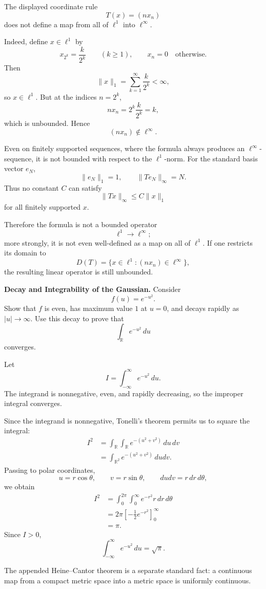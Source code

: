 \begin{solution}
The displayed coordinate rule
\[
T(x)=(n x_n)
\]
does not define a map from all of \(\ell^1\) into \(\ell^\infty\).

Indeed, define \(x\in\ell^1\) by
\[
x_{2^k}=\frac{k}{2^k}\qquad(k\ge1),
\qquad
x_n=0\quad\text{otherwise}.
\]
Then
\[
\|x\|_1
=
\sum_{k=1}^{\infty}\frac{k}{2^k}
<\infty,
\]
so \(x\in\ell^1\). But at the indices \(n=2^k\),
\[
n x_n
=
2^k\frac{k}{2^k}
=
k,
\]
which is unbounded. Hence
\[
(nx_n)\notin\ell^\infty.
\]

Even on finitely supported sequences, where the formula always produces an
\(\ell^\infty\)-sequence, it is not bounded with respect to the
\(\ell^1\)-norm. For the standard basis vector \(e_N\),
\[
\|e_N\|_1=1,
\qquad
\|Te_N\|_\infty=N.
\]
Thus no constant \(C\) can satisfy
\[
\|Tx\|_\infty\le C\|x\|_1
\]
for all finitely supported \(x\).

Therefore the formula is not a bounded operator
\[
\ell^1\longrightarrow\ell^\infty;
\]
more strongly, it is not even well-defined as a map on all of \(\ell^1\).
If one restricts its domain to
\[
D(T)=\{x\in\ell^1:(nx_n)\in\ell^\infty\},
\]
the resulting linear operator is still unbounded.
\end{solution}


\begin{problem}[CP-II-0495]
\label{prob:cp-ii-0495}
\textbf{Decay and Integrability of the Gaussian.}
Consider
\[
f(u)=e^{-u^2}.
\]
Show that \(f\) is even, has maximum value \(1\) at \(u=0\), and decays rapidly
as \(|u|\to\infty\). Use this decay to prove that
\[
\int_{\mathbb R}e^{-u^2}\,du
\]
converges.
\end{problem}

\begin{solution}
Let
\[
I=\int_{-\infty}^{\infty}e^{-u^2}\,du.
\]
The integrand is nonnegative, even, and rapidly decreasing, so the improper integral
converges.

Since the integrand is nonnegative, Tonelli's theorem permits us to square the integral:
\[
\begin{aligned}
I^2
&=
\int_{\mathbb R}\int_{\mathbb R}
e^{-(u^2+v^2)}\,du\,dv\\
&=
\int_{\mathbb R^2}e^{-(u^2+v^2)}\,dudv.
\end{aligned}
\]
Passing to polar coordinates,
\[
u=r\cos\theta,\qquad
v=r\sin\theta,\qquad
dudv=r\,dr\,d\theta,
\]
we obtain
\[
\begin{aligned}
I^2
&=
\int_0^{2\pi}\int_0^\infty
e^{-r^2}r\,dr\,d\theta\\
&=
2\pi
\left[
-\frac12e^{-r^2}
\right]_{0}^{\infty}\\
&=
\pi.
\end{aligned}
\]
Since \(I>0\),
\[
\boxed{
\int_{-\infty}^{\infty}e^{-u^2}\,du
=
\sqrt{\pi}.
}
\]

The appended Heine--Cantor theorem is a separate standard fact: a continuous map from a
compact metric space into a metric space is uniformly continuous.
\end{solution}


